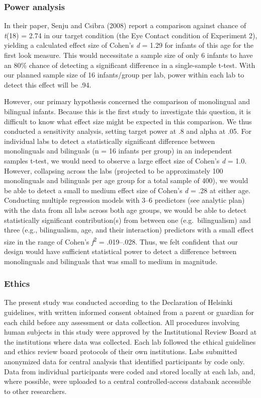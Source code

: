 \documentclass[,man,floatsintext]{apa6}
\begin{document}
\hypertarget{power-analysis}{%
\subsubsection{Power analysis}\label{power-analysis}}

In their paper, Senju and Csibra (2008) report a comparison against chance of \emph{t}(18) = 2.74 in our target condition (the Eye Contact condition of Experiment 2), yielding a calculated effect size of Cohen's \emph{d} = 1.29 for infants of this age for the first look measure. This would necessitate a sample size of only 6 infants to have an 80\% chance of detecting a significant difference in a single-sample t-test. With our planned sample size of 16 infants/group per lab, power within each lab to detect this effect will be .94.

However, our primary hypothesis concerned the comparison of monolingual and bilingual infants. Because this is the first study to investigate this question, it is difficult to know what effect size might be expected in this comparison. We thus conducted a sensitivity analysis, setting target power at .8 and alpha at .05. For individual labs to detect a statistically significant difference between monolinguals and bilinguals (n = 16 infants per group) in an independent samples t-test, we would need to observe a large effect size of Cohen's \emph{d} = 1.0. However, collapsing across the labs (projected to be approximately 100 monolinguals and bilinguals per age group for a total sample of 400), we would be able to detect a small to medium effect size of Cohen's \emph{d} = .28 at either age. Conducting multiple regression models with 3--6 predictors (see analytic plan) with the data from all labs across both age groups, we would be able to detect statistically significant contribution(s) from between one (e.g.~bilingualism) and three (e.g., bilingualism, age, and their interaction) predictors with a small effect size in the range of Cohen's \emph{ƒ}\textsuperscript{2} = .019--.028. Thus, we felt confident that our design would have sufficient statistical power to detect a difference between monolinguals and bilinguals that was small to medium in magnitude.

\hypertarget{ethics}{%
\subsubsection{Ethics}\label{ethics}}

The present study was conducted according to the Declaration of Helsinki guidelines, with written informed consent obtained from a parent or guardian for each child before any assessment or data collection. All procedures involving human subjects in this study were approved by the Institutional Review Board at the institutions where data was collected. Each lab followed the ethical guidelines and ethics review board protocols of their own institutions. Labs submitted anonymized data for central analysis that identified participants by code only. Data from individual participants were coded and stored locally at each lab, and, where possible, were uploaded to a central controlled-access databank accessible to other researchers.
\end{document}
